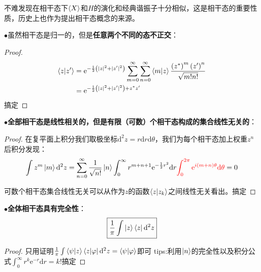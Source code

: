 \documentclass[a4paper,zihao=-4,linespread=1]{ctexrep}
\newtheorem*{proof}{证明}
\newcommand\qed[0]{\hfill$\boxed{\text{搞定}}$}
\begin{document}
    不难发现在相干态下$\braket{X}$和$H$的演化和经典谐振子十分相似，这是相干态的重要性质，历史上也作为提出相干态概念的来源。
    
    $\bullet$虽然相干态是归一的，但是\textbf{任意两个不同的态不正交}：
    \begin{proof}
    	\begin{align*}
    		\braket{z|z^\prime}&=\mathrm{e}^{-\frac{1}{2}\left(|z|^2+|z^\prime|^2\right)}\sum_{m=0}^\infty\sum_{n=0}^\infty\braket{m|z}\frac{\left(z^*\right)^m\left(z^\prime\right)^n}{\sqrt{m!n!}}\\
    		&=\mathrm{e}^{-\frac{1}{2}\left(|z|^2+|z^\prime|^2\right)+z^*z^\prime}
    	\end{align*}
    	\qed
    \end{proof}
    
    $\bullet$\textbf{全部相干态是线性相关的，但是有限（可数）个相干态构成的集合线性无关的}：
    \begin{proof}
    	在复平面上积分我们取极坐标$\mathrm{d}^2z=r\mathrm{d}r\mathrm{d}\theta$，我们为每个相干态加上权重$z^n$后积分发现：
    	\begin{align*}
    		\int z^m\ket{m}\mathrm{d}^2z=\sum_{n=0}^\infty\frac{1}{\sqrt{n!}}\ket{n}\int_0^\infty r^{m+n+1}\mathrm{e}^{-\frac{1}{2}r^2}\mathrm{d}r{\color{red}\int_0^{2\pi}\mathrm{e}^{i(m+n)\theta}\mathrm{d}\theta}=0
    	\end{align*}
    	
    	可数个相干态集合线性无关可以从作为$z$的函数$\braket{z|z_k}$之间线性无关看出。\qed
    \end{proof}
    $\bullet$\textbf{全体相干态具有完全性}：
    \begin{equation}
    	\boxed{\frac{1}{\pi}\int\ket{z}\bra{z}\mathrm{d}^2z}
    \end{equation}
    \begin{proof}
    	只用证明$\frac{1}{\pi}\int\braket{\psi|z}\bra{z|\varphi}\mathrm{d}^2z=\braket{\psi|\varphi}$即可
    	tips:利用$\ket{n}$的完全性以及积分公式$\int_0^\infty r^{k}\mathrm{e}^{-r}\mathrm{d}r=k!$\qed
    \end{proof}
\end{document}
